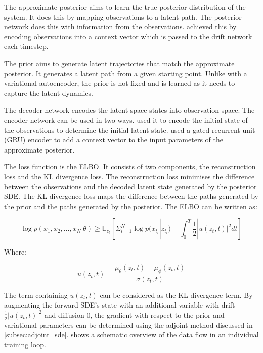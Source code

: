 The approximate posterior aims to learn the true posterior distribution of the system. It does this by mapping
observations to a latent path. The posterior network does this with information from the observations.
\textcite{liScalableGradientsStochastic2020} achieved this by encoding observations into a context vector which is
passed to the drift network each timestep.

The prior aims to generate latent trajectories that match the approximate posterior. It generates a latent path from a
given starting point. Unlike with a variational autoencoder, the prior is not fixed and is learned as it needs to capture the latent dynamics.

The decoder network encodes the latent space states into observation space. The encoder network can be used in two ways.
\textcite{ryzhikovLatentStochasticDifferential2023} used it to encode the initial state of the observations to determine
the initial latent state. \textcite{liScalableGradientsStochastic2020} used a gated recurrent unit (GRU) encoder to add a context vector to the
input parameters of the approximate posterior.

The loss function is the ELBO. It consists of two components, the reconstruction loss and the KL divergence loss. The
reconstruction loss minimises the difference between the observations and the decoded latent state generated by the
posterior SDE. The KL divergence loss maps the difference between the paths generated by
the prior and the paths generated by the posterior. The ELBO can be written as:

\begin{equation} 
    \log p(x_{1}, x_{2}, {\dots }, x_{N}|\theta) \geq \mathbb{E}_{z_{t}}\left[{\Sigma
_{i=1}^{N}\log p(x_{t_{i}}|z_{t_{i}})-\int _{0}^{T}\frac {1}{2}|u(z_{t},t)|^{2}dt}\right]
\end{equation}

Where:

\begin{equation} 
    u(z_{t},t)=\frac {\mu _{\theta} (z_{t},t)-\mu _{\phi} (z_{t},t)}{\sigma (z_{t},t)}
\end{equation} 

The term containing \(u(z_t, t)\) can be considered as the KL-divergence term. By augmenting the forward SDE's state
with an additional variable with drift \(\frac {1}{2}|u(z_{t},t)|^{2}\) and diffusion \(0\), the gradient with respect
to the prior and variational parameters can be determined using the adjoint method discussed in
\cref{subsec:adjoint_sde}.  shows a schematic overview of the data flow in an individual
training loop.

